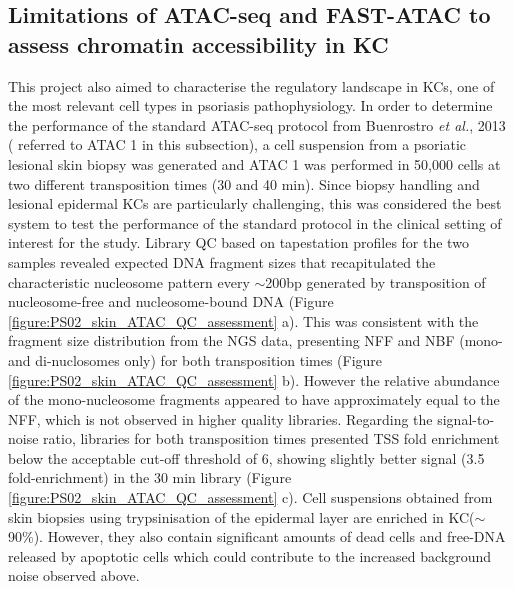 \subsection{Limitations of ATAC-seq and FAST-ATAC to assess chromatin accessibility in KC}
This project also aimed to characterise the regulatory landscape in KCs, one of the most relevant cell types in psoriasis pathophysiology. In order to determine the performance of the standard ATAC-seq protocol from Buenrostro \textit{et al.}, 2013 ( referred to ATAC 1 in this subsection), a cell suspension from a psoriatic lesional skin biopsy was generated and ATAC 1 was performed in 50,000 cells at two different transposition times (30 and 40 min). Since biopsy handling and lesional epidermal KCs are particularly challenging, this was considered the best system to test the performance of the standard protocol in the clinical setting of interest for the study. Library QC based on tapestation profiles for the two samples revealed expected DNA fragment sizes that recapitulated the characteristic nucleosome pattern every $\sim$200bp generated by transposition of nucleosome-free and nucleosome-bound DNA (Figure \ref{figure:PS02_skin_ATAC_QC_assessment} a). This was consistent with the fragment size distribution from the NGS data, presenting NFF and NBF (mono-and di-nuclosomes only) for both transposition times (Figure \ref{figure:PS02_skin_ATAC_QC_assessment} b). However the  relative abundance of the mono-nucleosome fragments appeared to have approximately equal to the NFF, which is not observed in higher quality libraries. Regarding the signal-to-noise ratio, libraries for both transposition times presented TSS fold enrichment below the acceptable cut-off threshold of 6, showing slightly better signal (3.5 fold-enrichment) in the 30 min library (Figure \ref{figure:PS02_skin_ATAC_QC_assessment} c). Cell suspensions obtained from skin biopsies using trypsinisation of the epidermal layer are enriched in KC($\sim$90\%). However, they also contain significant amounts of dead cells and free-DNA released by apoptotic cells which could contribute to the increased background noise observed above. 



